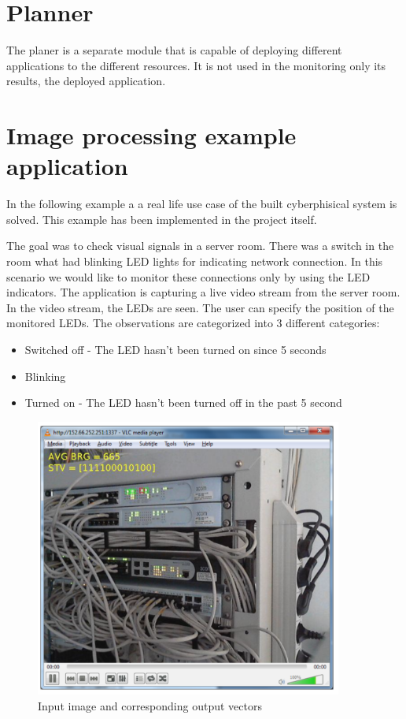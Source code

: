 \section{Planner}
The planer is a separate module that is capable of deploying different applications to the different resources. It is not used in the monitoring only its results, the deployed application.

\section{Image processing example application}

In the following example a a real life use case of the built cyberphisical system is solved. This example has been implemented in the project itself\cite{g6d1}. 

The goal was to check visual signals in a server room. There was a switch in the room what had blinking LED lights for indicating network connection. In this scenario we would like to monitor these connections only by using the LED indicators. The application is capturing a live video stream from the server room. In the video stream, the LEDs are seen. The user can specify the position of the monitored LEDs. The observations are categorized into 3 different categories:
\begin{itemize}
	\item Switched off - The LED hasn't been turned on since 5 seconds
	\item Blinking
	\item Turned on - The LED hasn't been turned off in the past 5 second
\end{itemize}

\begin{figure}[h]
	\centering
	\includegraphics[width=0.9\textwidth]{figures/switchwork.png}
	\caption{Input image and corresponding output vectors\label{fig:switchwork}}
\end{figure}

